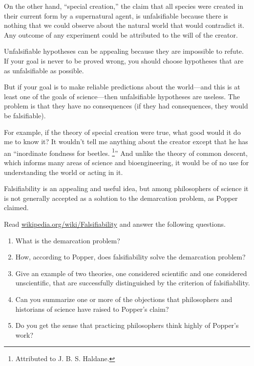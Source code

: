 \documentclass[10pt]{book}
\begin{document}
On the other hand, ``special creation,'' the claim that all species
were created in their current form by a supernatural agent, is
unfalsifiable because there is nothing that we could observe about the
natural world that would contradict it.  Any outcome of any experiment
could be attributed to the will of the creator.

Unfalsifiable hypotheses can be appealing because
they are impossible to refute.  If your goal is never to be
proved wrong, you should choose hypotheses that are as
unfalsifiable as possible.

But if your goal is to make reliable predictions about the world---and
this is at least one of the goals of science---then unfalsifiable
hypotheses are useless.  The problem is that they have
no consequences (if they had consequences, they would be
falsifiable).

For example, if the theory of special creation were true, what good
would it do me to know it?  It wouldn't tell me anything about the
creator except that he has an ``inordinate fondness for beetles.
\footnote{Attributed to J. B. S. Haldane.}''  And unlike the
theory of common descent, which informs many areas of science
and bioengineering, it would be of no use for understanding
the world or acting in it.

\begin{exercise}

Falsifiability is an appealing and useful idea, but among
philosophers of science it is not generally accepted
as a solution to the demarcation problem, as Popper claimed.

Read \url{wikipedia.org/wiki/Falsifiability} and answer the following
questions.

\begin{enumerate}

\item What is the demarcation problem?

\item How, according to Popper, does falsifiability solve the
demarcation problem?

\item Give an example of two theories, one considered scientific
and one considered unscientific, that are successfully distinguished
by the criterion of falsifiability.

\item Can you summarize one or more of the objections that
philosophers and historians of science have raised to Popper's
claim?

\item Do you get the sense that practicing philosophers think
highly of Popper's work?

\end{enumerate}

\end{exercise}
\end{document}
